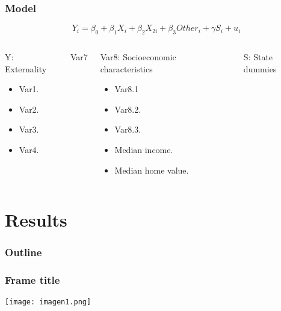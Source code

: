 \documentclass{beamer}
\begin{document}
\begin{frame}
\frametitle{Model}

\begin{equation}
Y_i=\beta_0 + \beta_1 X_i+\beta_2 X_{2i} + \beta_3 Other_i + \gamma S_i+u_i
\end{equation}



\begin{columns}
\begin{block}{Y: Externality}
\begin{itemize}
\item Var1.
\item Var2.
\item Var3.
\item Var4.
\end{itemize}
 \end{block}
\begin{block}{Var7}
\end{block}

\begin{block}{Var8: Socioeconomic characteristics}
\begin{itemize}
\item Var8.1
\item Var8.2.
\item Var8.3.
\item Median income.
\item Median home value.
\end{itemize}
\end{block}
\begin{block}{S: State dummies}
\end{block}
\end{columns}
\end{frame}


\section{Results}

 \begin{frame}
       \frametitle{Outline}
       \tableofcontents
\end{frame}

\begin{frame}
\frametitle{Frame title}


\begin{center}
\texttt{[image: imagen1.png]}%
\end{center}
\end{frame}
\end{document}
